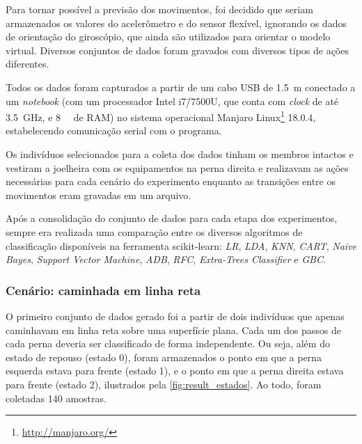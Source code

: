 Para tornar possível a previsão dos movimentos, foi decidido que seriam armazenados os valores do acelerômetro e do sensor flexível, ignorando os dados de orientação do giroscópio, que ainda são utilizados para orientar o modelo virtual. Diversos conjuntos de dados foram gravados com diversos tipos de ações diferentes.

Todos os dados foram capturados a partir de um cabo USB de \SI{1.5}{\meter} conectado a um \textit{notebook} (com um processador Intel i7\=/7500U, que conta com \textit{clock} de até \SI{3.5}{\giga\hertz}, e \SI{8}{\giga\byte} de RAM) no sistema operacional Manjaro Linux\footnote{\url{http://manjaro.org/}} 18.0.4, estabelecendo comunicação serial com o programa.

Os indivíduos selecionados para a coleta dos dados tinham os membros intactos e vestiram a joelheira com os equipamentos na perna direita e realizavam as ações necessárias para cada cenário do experimento enquanto as transições entre os movimentos eram gravadas em um arquivo.

Após a consolidação do conjunto de dados para cada etapa dos experimentos, sempre era realizada uma comparação entre os diversos algoritmos de classificação disponíveis na ferramenta scikit-learn: \textit{LR}, \textit{LDA}, \textit{KNN}, \textit{CART}, \textit{Naive Bayes}, \textit{Support Vector Machine}, \textit{ADB}, \textit{RFC}, \textit{Extra-Trees Classifier} e \textit{GBC}.

\subsubsection{Cenário: caminhada em linha reta}

O primeiro conjunto de dados gerado foi a partir de dois indivíduos que apenas caminhavam em linha reta sobre uma superfície plana. Cada um dos passos de cada perna deveria ser classificado de forma independente. Ou seja, além do estado de repouso (estado 0), foram armazenados o ponto em que a perna esquerda estava para frente (estado 1), e o ponto em que a perna direita estava para frente (estado 2), ilustrados pela \autoref{fig:result_estados}. Ao todo, foram coletadas 140 amostras.

